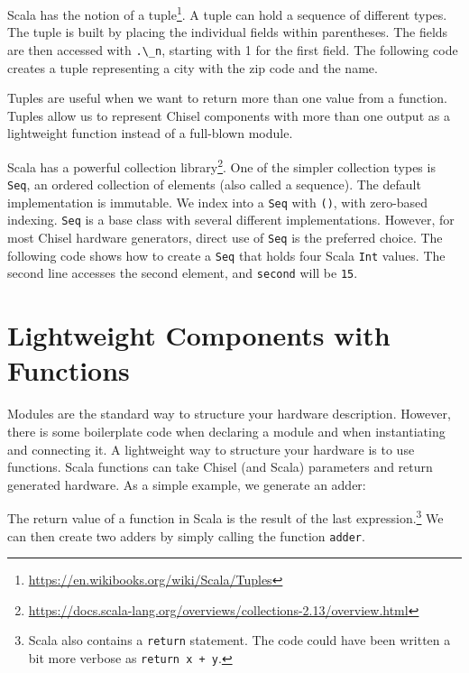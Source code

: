 \documentclass[%
    10pt,
    headinclude, footexclude,
    openright, %
    notitlepage,
    cleardoubleempty,
    headsepline,
    pointlessnumbers,
    bibtotoc, idxtotoc,
    ]{scrbook}
\newcommand{\code}[1]{{\lstinline[basicstyle=\small\ttfamily]{#1}}}
\newcommand{\codefoot}[1]{{\lstinline[basicstyle=\footnotesize\ttfamily]{#1}}}
\newcommand{\myref}[2]{\href{#1}{#2}}
\renewcommand{\myref}[2]{{#2}{\footnote{\url{#1}}}}
\begin{document}
Scala has the notion of a \myref{https://en.wikibooks.org/wiki/Scala/Tuples}{tuple}.
A tuple can hold a sequence of different types. The tuple is built by placing the individual fields
within parentheses. The fields are then accessed with \code{.\_n}, starting with 1 for the first field.
The following code creates a tuple representing a city with the zip code and the name.



\noindent Tuples are useful when we want to return more than one value from a function.
Tuples allow us to represent Chisel components with more than one output as a lightweight
function instead of a full-blown module.

Scala has a powerful \myref{https://docs.scala-lang.org/overviews/collections-2.13/overview.html}{collection library}.
One of the simpler collection types is \code{Seq}, an ordered collection of elements (also called a sequence).
The default implementation is immutable. We index into a \code{Seq} with \code{()},
with zero-based indexing.
\code{Seq} is a base class with several different implementations.
However, for most Chisel hardware generators, direct use of \code{Seq}
is the preferred choice. The following code shows how to create a \code{Seq}
that holds four Scala \code{Int} values. The second line accesses the
second element, and \code{second} will be \code{15}.






\section{Lightweight Components with Functions}
\label{sec:functions}


Modules are the standard way to structure your hardware description.
However, there is some boilerplate code when declaring a module and when instantiating and
connecting it.
A lightweight way to structure your hardware is to use functions.
Scala functions can take Chisel (and Scala) parameters and return generated hardware.
As a simple example, we generate an adder:


\noindent The return value of a function in Scala is the result of the last
expression.\footnote{Scala also contains a \codefoot{return} statement. The code could have been written
a bit more verbose as \codefoot{return x + y}.}
We can then create two adders by simply calling the function \code{adder}.
\end{document}
